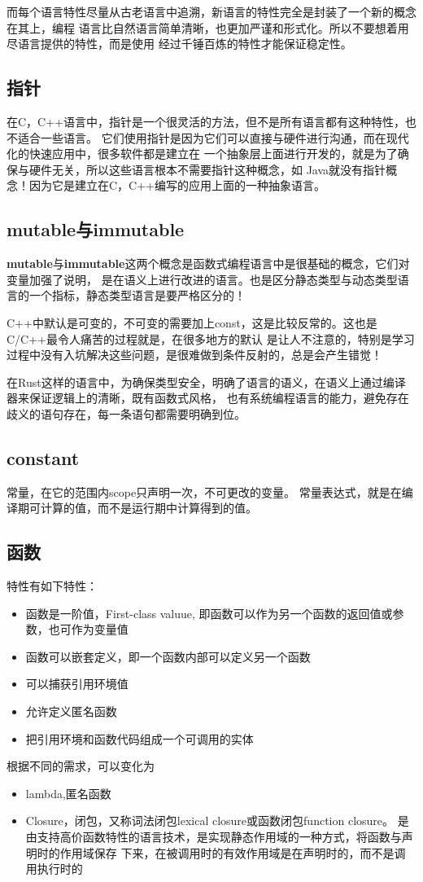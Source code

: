 而每个语言特性尽量从古老语言中追溯，新语言的特性完全是封装了一个新的概念在其上，编程
语言比自然语言简单清晰，也更加严谨和形式化。所以不要想着用尽语言提供的特性，而是使用
经过千锤百炼的特性才能保证稳定性。

\subsection{指针}
在C，C++语言中，指针是一个很灵活的方法，但不是所有语言都有这种特性，也不适合一些语言。
它们使用指针是因为它们可以直接与硬件进行沟通，而在现代化的快速应用中，很多软件都是建立在
一个抽象层上面进行开发的，就是为了确保与硬件无关，所以这些语言根本不需要指针这种概念，如
Java就没有指针概念！因为它是建立在C，C++编写的应用上面的一种抽象语言。

\subsection{mutable与immutable}
\textbf{mutable}与\textbf{immutable}这两个概念是函数式编程语言中是很基础的概念，它们对变量加强了说明，
是在语义上进行改进的语言。也是区分静态类型与动态类型语言的一个指标，静态类型语言是要严格区分的！

C++中默认是可变的，不可变的需要加上const，这是比较反常的。这也是C/C++最令人痛苦的过程就是，在很多地方的默认
是让人不注意的，特别是学习过程中没有入坑解决这些问题，是很难做到条件反射的，总是会产生错觉！

在Rust这样的语言中，为确保类型安全，明确了语言的语义，在语义上通过编译器来保证逻辑上的清晰，既有函数式风格，
也有系统编程语言的能力，避免存在歧义的语句存在，每一条语句都需要明确到位。

\subsection{constant}
常量，在它的范围内scope只声明一次，不可更改的变量。
常量表达式，就是在编译期可计算的值，而不是运行期中计算得到的值。

\subsection{函数}
特性有如下特性：
\begin{itemize}
    \item {函数是一阶值，First-class valuue, 即函数可以作为另一个函数的返回值或参数，也可作为变量值}
    \item {函数可以嵌套定义，即一个函数内部可以定义另一个函数}
    \item {可以捕获引用环境值}
    \item {允许定义匿名函数}
    \item {把引用环境和函数代码组成一个可调用的实体}
\end{itemize}
根据不同的需求，可以变化为
\begin{itemize}
    \item {lambda,匿名函数}
    \item {Closure，闭包，又称词法闭包lexical closure或函数闭包function closure。
    是由支持高价函数特性的语言技术，是实现静态作用域的一种方式，将函数与声明时的作用域保存
    下来，在被调用时的有效作用域是在声明时的，而不是调用执行时的}
\end{itemize}

